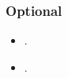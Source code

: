 \documentclass[abstract=on,parskip=full,headings=standardclasses,fontsize=11pt,paper=a4]{scrartcl}
\begin{document}
\subsubsection*{Optional}

\begin{itemize}
\item {}.
\item {}.
\end{itemize}


\sloppy
\renewcommand*{\bibfont}{\small}

\setlength{\bibitemsep}{0.2em} %
\printbibliography

\bigskip

\end{document}
